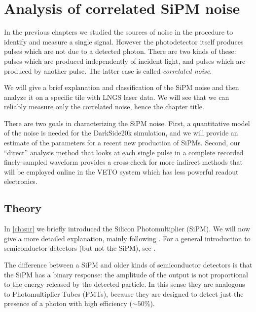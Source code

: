 \chapter{Analysis of correlated SiPM noise}
\label{ch:anal}

In the previous chapters we studied the sources of noise in the procedure to
identify and measure a single signal. However the photodetector itself produces
pulses which are not due to a detected photon. There are two kinds of these:
pulses which are produced independently of incident light, and pulses which are
produced by another pulse. The latter case is called \emph{correlated noise}.

We will give a brief explanation and classification of the SiPM noise and then
analyze it on a specific tile with LNGS laser data. We will see that we can
reliably measure only the correlated noise, hence the chapter title.

There are two goals in characterizing the SiPM noise. First, a quantitative
model of the noise is needed for the DarkSide20k simulation, and we will
provide an estimate of the parameters for a recent new production of SiPMs.
Second, our ``direct'' analysis method that looks at each single pulse in a
complete recorded finely-sampled waveform provides a cross-check for more
indirect methods that will be employed online in the VETO system which has less
powerful readout electronics.


\section{Theory}


In \autoref{ch:snr} we briefly introduced the Silicon Photomultiplier (SiPM).
We will now give a more detailed explanation, mainly following
\cite[ch.~3]{savarese2018}. For a general introduction to semiconductor
detectors (but not the SiPM), see \cite[ch.~11]{knoll2010}.

The difference between a SiPM and older kinds of semiconductor detectors is
that the SiPM has a binary response: the amplitude of the output is not
proportional to the energy released by the detected particle. In this sense
they are analogous to Photomultiplier Tubes (PMTs), because they are designed
to detect just the presence of a photon with high efficiency ($\sim\SI{50}\%$).

